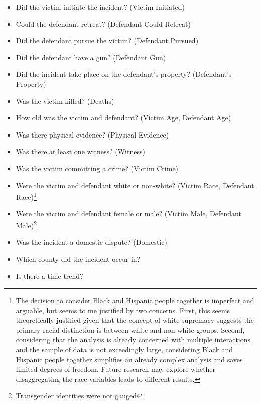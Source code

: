 \documentclass[12pt,article]{article}
\begin{document}
\begin{itemize}
\itemsep1pt\parskip0pt
\item
  Did the victim initiate the incident? (Victim Initiated)
\item
  Could the defendant retreat? (Defendant Could Retreat)
\item
  Did the defendant pursue the victim? (Defendant Pursued)
\item
  Did the defendant have a gun? (Defendant Gun)
\item
  Did the incident take place on the defendant's property? (Defendant's
  Property)
\item
  Was the victim killed? (Deaths)
\item
  How old was the victim and defendant? (Victim Age, Defendant Age)
\item
  Was there physical evidence? (Physical Evidence)
\item
  Was there at least one witness? (Witness)
\item
  Was the victim committing a crime? (Victim Crime)
\item
  Were the victim and defendant white or non-white? (Victim Race,
  Defendant Race)\footnote{The decision to consider Black and Hispanic
    people together is imperfect and arguable, but seems to me justified
    by two concerns. First, this seems theoretically justified given
    that the concept of white supremacy suggests the primary racial
    distinction is between white and non-white groups. Second,
    considering that the analysis is already concerned with multiple
    interactions and the sample of data is not exceedingly large,
    considering Black and Hispanic people together simplifies an already
    complex analysis and saves limited degrees of freedom. Future
    research may explore whether disaggregating the race variables leads
    to different results.}
\item
  Were the victim and defendant female or male? (Victim Male, Defendant
  Male)\footnote{Transgender identities were not gauged}
\item
  Was the incident a domestic dispute? (Domestic)
\item
  Which county did the incident occur in?
\item
  Is there a time trend?
\end{itemize}
\end{document}
